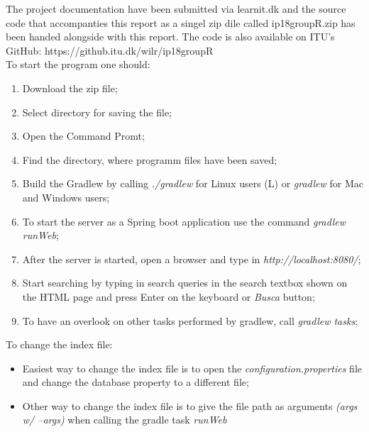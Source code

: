 The project documentation have been submitted via learnit.dk and the source code that accompanties this report as a singel zip dile called ip18groupR.zip has been handed alongside with this report.
The code is also available on ITU's GitHub: https://github.itu.dk/wilr/ip18groupR\\
To start the program one should:
\begin{enumerate}
    \item Download the zip file;
    \item Select directory for saving the file;
    \item Open the Command Promt;
    \item Find the directory, where programm files have been saved;
    \item Build the Gradlew by calling  \textit{./gradlew} for Linux users (L) or \textit{gradlew} for Mac and Windows users;
    \item To start the server as a  Spring boot application use the command \textit{gradlew runWeb};
    \item After the server is started, open a browser and type in \textit{http://localhost:8080/};
    \item Start searching by typing in search queries in the search textbox shown on the HTML page and press Enter on the keyboard or \textit{Busca} button;
    \item To have an overlook on other tasks performed by gradlew, call \textit{gradlew tasks};
\end{enumerate}

To change the index file:
\begin{itemize}
    \item Easiest way to change the index file is to open the \textit{configuration.properties} file and change the database property to a different file;
    \item Other way to change the index file is to give the file path as arguments \textit{(args w/ --args)} when calling the gradle task \textit{runWeb}
\end{itemize}

